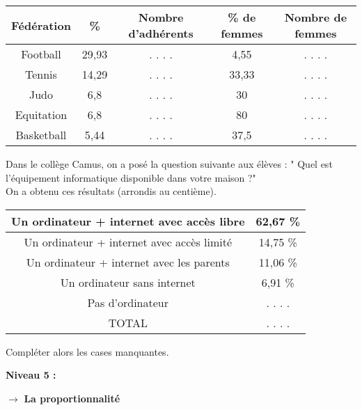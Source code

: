 \documentclass[a4paper,11pt]{article}
\newcounter{numexo}
\newcommand{\exo}[1]{\stepcounter{numexo}\noindent{\bf \underline{Exercice~\thenumexo}}}
\begin{document}
\begin{tabular}{|c|c|c|c|c|}
\hline 
Fédération & \% & Nombre d'adhérents & \% de femmes & Nombre de femmes \\ 
\hline 
Football & 29,93 & . . . . & 4,55 & . . . . \\ 
\hline 
Tennis & 14,29 & . . . . & 33,33 & . . . . \\ 
\hline 
Judo  & 6,8 & . . . . & 30 & . . . . \\ 
\hline 
Equitation & 6,8 & . . . . & 80 & . . . . \\ 
\hline 
Basketball & 5,44 & . . . . & 37,5 & . . . . \\ 
\hline 
\end{tabular} 


\exo \\ Dans le collège Camus, on a posé la question suivante aux élèves : " Quel est l'équipement informatique disponible dans votre maison ?" \\
On a obtenu ces résultats (arrondis au centième).\\

\begin{tabular}{|c|c|}
\hline 
Un ordinateur + internet avec accès libre  & 62,67 \% \\ 
\hline 
Un ordinateur + internet avec accès limité  & 14,75 \% \\  
\hline 
Un ordinateur + internet avec les parents  & 11,06 \% \\   
\hline 
Un ordinateur sans  internet  & 6,91 \% \\ 
\hline 
Pas d'ordinateur & . . . . \\ 
\hline 
TOTAL & . . . . \\ 
\hline 
\end{tabular} 

Compléter alors les cases manquantes.\\







\begin{center}
{\Large \textbf{Niveau 5 :}}
\end{center}

\vspace*{1cm}

$\rightarrow$ \textbf{La proportionnalité}\\

\vspace*{0.5cm}
\end{document}
